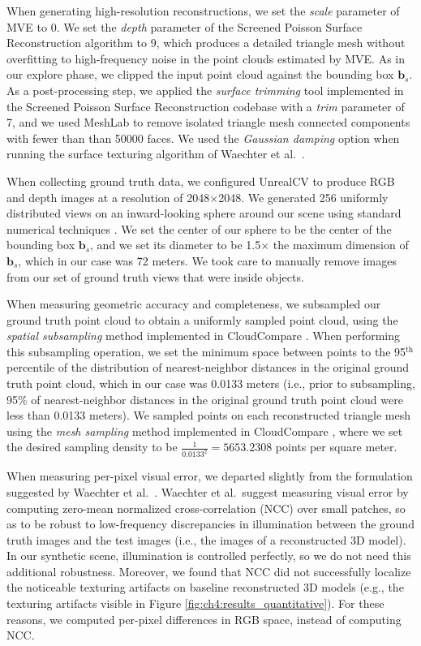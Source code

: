 When generating high-resolution reconstructions, we set the \emph{scale} parameter of MVE \cite{fuhrmann:2015} to 0.
We set the \emph{depth} parameter of the Screened Poisson Surface Reconstruction algorithm \cite{kazhdan:2013} to 9, which produces a detailed triangle mesh without overfitting to high-frequency noise in the point clouds estimated by MVE.
As in our explore phase, we clipped the input point cloud against the bounding box $\mathbf{b}_s$.
As a post-processing step, we applied the \emph{surface trimming} tool implemented in the Screened Poisson Surface Reconstruction codebase with a \emph{trim} parameter of 7, and we used MeshLab \cite{cignoni:2008} to remove isolated triangle mesh connected components with fewer than than 50000 faces.
We used the \emph{Gaussian damping} option when running the surface texturing algorithm of Waechter et al.~\cite{waechter:2014}.

When collecting ground truth data, we configured UnrealCV to produce RGB and depth images at a resolution of 2048$\times$2048.
We generated 256 uniformly distributed views on an inward-looking sphere around our scene using standard numerical techniques \cite{devert:2012}.
We set the center of our sphere to be the center of the bounding box $\mathbf{b}_s$, and we set its diameter to be 1.5$\times$ the maximum dimension of $\mathbf{b}_s$, which in our case was 72 meters.
We took care to manually remove images from our set of ground truth views that were inside objects.

When measuring geometric accuracy and completeness, we subsampled our ground truth point cloud to obtain a uniformly sampled point cloud, using the \emph{spatial subsampling} method implemented in CloudCompare \cite{cloudcompare:2017}.
When performing this subsampling operation, we set the minimum space between points to the 95$^{\text{th}}$ percentile of the distribution of nearest-neighbor distances in the original ground truth point cloud, which in our case was 0.0133 meters (i.e., prior to subsampling, 95\% of nearest-neighbor distances in the original ground truth point cloud were less than 0.0133 meters).
We sampled points on each reconstructed triangle mesh using the \emph{mesh sampling} method implemented in CloudCompare \cite{cloudcompare:2017}, where we set the desired sampling density to be $\frac{1}{0.0133^2} = 5653.2308$ points per square meter.

When measuring per-pixel visual error, we departed slightly from the formulation suggested by Waechter et al.~\cite{waechter:2017}.
Waechter et al.~suggest measuring visual error by computing zero-mean normalized cross-correlation (NCC) over small patches, so as to be robust to low-frequency discrepancies in illumination between the ground truth images and the test images (i.e., the images of a reconstructed 3D model).
In our synthetic scene, illumination is controlled perfectly, so we do not need this additional robustness.
Moreover, we found that NCC did not successfully localize the noticeable texturing artifacts on baseline reconstructed 3D models (e.g., the texturing artifacts visible in Figure \ref{fig:ch4:results_quantitative}).
For these reasons, we computed per-pixel differences in RGB space, instead of computing NCC.

